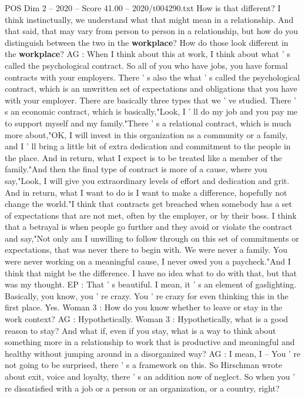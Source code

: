 \begin{textsample}{POS Dim 2 – 2020 – Score 41.00 – 2020/t004290.txt}
How is that different?
I think instinctually, we understand what that might mean in a relationship.
And that said, that may vary from person to person in a relationship, but how do you distinguish between the two in the \textbf{workplace}?
How do those look different in the \textbf{workplace}?
AG : When I think about this at work, I think about what ' s called the psychological contract.
So all of you who have jobs, you have formal contracts with your employers.
There ' s also the what ' s called the psychological contract, which is an unwritten set of expectations and obligations that you have with your employer.
There are basically three types that we ' ve studied.
There ' s an economic contract, which is basically,"Look, I ' ll do my job and you pay me to support myself and my family."There ' s a relational contract, which is much more about,"OK, I will invest in this organization as a community or a family, and I ' ll bring a little bit of extra dedication and commitment to the people in the place.
And in return, what I expect is to be treated like a member of the family."And then the final type of contract is more of a cause, where you say,"Look, I will give you extraordinary levels of effort and dedication and grit.
And in return, what I want to do is I want to make a difference, hopefully not change the world."I think that contracts get breached when somebody has a set of expectations that are not met, often by the employer, or by their boss.
I think that a betrayal is when people go further and they avoid or violate the contract and say,"Not only am I unwilling to follow through on this set of commitments or expectations, that was never there to begin with.
We were never a family.
You were never working on a meaningful cause, I never owed you a paycheck."And I think that might be the difference.
I have no idea what to do with that, but that was my thought.
EP : That ' s beautiful.
I mean, it ' s an element of gaslighting.
Basically, you know, you ' re crazy.
You ' re crazy for even thinking this in the first place.
Yes.
Woman 3 : How do you know whether to leave or stay in the work context?
AG : Hypothetically.
Woman 3 : Hypothetically, what is a good reason to stay?
And what if, even if you stay, what is a way to think about something more in a relationship to work that is productive and meaningful and healthy without jumping around in a disorganized way?
AG : I mean, I -- You ' re not going to be surprised, there ' s a framework on this.
So Hirschman wrote about exit, voice and loyalty, there ' s an addition now of neglect.
So when you ' re dissatisfied with a job or a person or an organization, or a country, right?

\end{textsample}
